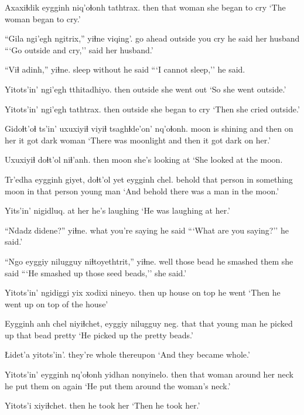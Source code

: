 \documentclass[12pt]{article}
\begin{document}
\gll Axaxiɬdik eygginh niq'oɬonh tathtrax.
then  that  woman  {she began to cry}
\glt `The woman began to cry.'
\glend

\gll ``Gila ngi'egh ngitrix,'' yiɬne  viqing'.
{go ahead}  outside  {you cry} {he said} { her husband}
\glt ```Go outside and cry,'' said her husband.'
\glend

\gll ``Viɬ adinh,'' yiɬne.
sleep without {he said}
\glt ```I cannot sleep,'' he said.
\glend

\gll Yitots'in' ngi'egh tthitadhiyo.
then  outside  {she went out}
\glt `So she went outside.'
\glend

\gll Yitots'in' ngi'egh tathtrax.
then  outside  {she began to cry}
\glt `Then she cried outside.'
\glend

\gll Gidoɬt'oɬ ts'in' uxuxiyiɬ viyiɬ tsaghɬde'on' nq'oɬonh.
{moon is shining} and then {on her} {it got dark} woman
\glt `There was moonlight and then it got dark on her.'
\glend

\gll Uxuxiyiɬ doɬt'ol  niɬ'anh.
then  moon  {she's looking at}
\glt `She looked at the moon.
\glend

\gll Tr'edha eygginh giyet, doɬt'ol  yet eygginh chel.
behold  {that person}  {in something} moon  in  {that person} {young man}
\glt `And behold there was a man in the moon.'
\glend

\gll Yits'in' nigidluq.
{at her} {he's laughing}
\glt `He was laughing at her.'
\glend

\gll ``Ndadz didene?'' yiɬne.
what  {you're saying} {he said}
\glt ```What are you saying?'' he said.'
\glend

\gll ``Ngo eyggiy nilugguy niɬtoyethtrit,'' yiɬne.
well those  bead {he smashed them} {she said}
\glt ```He smashed up those seed beads,'' she said.'
\glend

\gll Yitots'in' ngidiggi yix xodixi nineyo.
then  up  house {on top} {he went}
\glt `Then he went up on top of the house'
\glend

\gll Eygginh anh chel niyiɬchet, eyggiy nilugguy neg.
that  that {young man} {he picked up} that bead pretty
\glt `He picked up the pretty beads.'
\glend

\gll Łidet'a  yitots'in'.
{they're whole} thereupon
\glt `And they became whole.'
\glend

\gll Yitots'in' eygginh nq'oɬonh yidhan nonyinelo.
then  that  woman {around her neck} {he put them on again}
\glt `He put them around the woman's neck.'
\glend

\gll Yitots'i xiyiɬchet.
then  {he took her}
\glt `Then he took her.'
\glend
\end{document}
